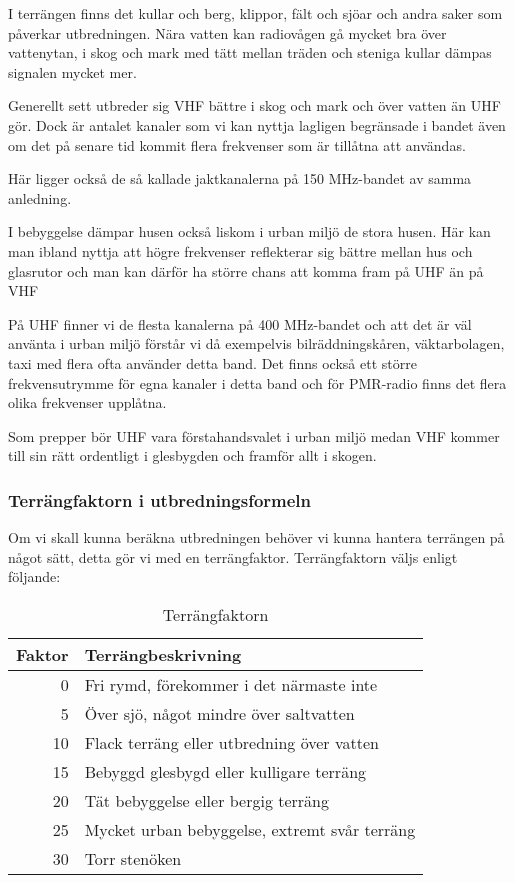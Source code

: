 \documentclass[12ypt,swedish,a4paper]{report}
\begin{document}
I terrängen finns det kullar och berg, klippor, fält och sjöar och andra saker som påverkar utbredningen. Nära vatten kan radiovågen gå mycket bra över vattenytan, i skog och mark med tätt mellan träden och steniga kullar dämpas signalen mycket mer.

Generellt sett utbreder sig VHF bättre i skog och mark och över vatten än UHF gör. Dock är antalet kanaler som vi kan nyttja lagligen begränsade i bandet även om det på senare tid kommit flera frekvenser som är tillåtna att användas.

Här ligger också de så kallade jaktkanalerna på 150 MHz-bandet av samma anledning.

I bebyggelse dämpar husen också liskom i urban miljö de stora husen. Här kan man ibland nyttja att högre frekvenser reflekterar sig bättre mellan hus och glasrutor och man kan därför ha större chans att komma fram på UHF än på VHF

På UHF finner vi de flesta kanalerna på 400 MHz-bandet och att det är väl använta i urban miljö förstår vi då exempelvis bilräddningskåren, väktarbolagen, taxi med flera ofta använder detta band. Det finns också ett större frekvensutrymme för egna kanaler i detta band och för PMR-radio finns det flera olika frekvenser upplåtna.

Som prepper bör UHF vara förstahandsvalet i urban miljö medan VHF kommer till sin rätt ordentligt i glesbygden och framför allt i skogen.

\subsubsection{Terrängfaktorn i utbredningsformeln}

Om vi skall kunna beräkna utbredningen behöver vi kunna hantera terrängen på något sätt, detta gör vi med en terrängfaktor. Terrängfaktorn väljs enligt följande:

\begin{table}[h]
\centering
\begin{tabular}{rl}
	Faktor & Terrängbeskrivning                            \\ \hline
	     0 & Fri rymd, förekommer i det närmaste inte      \\
	     5 & Över sjö, något mindre över saltvatten        \\
	    10 & Flack terräng eller utbredning över vatten    \\
	    15 & Bebyggd glesbygd eller kulligare terräng      \\
	    20 & Tät bebyggelse eller bergig terräng           \\
	    25 & Mycket urban bebyggelse, extremt svår terräng \\
	    30 & Torr stenöken
\end{tabular}
\caption{Terrängfaktorn}
\end{table}
\end{document}
